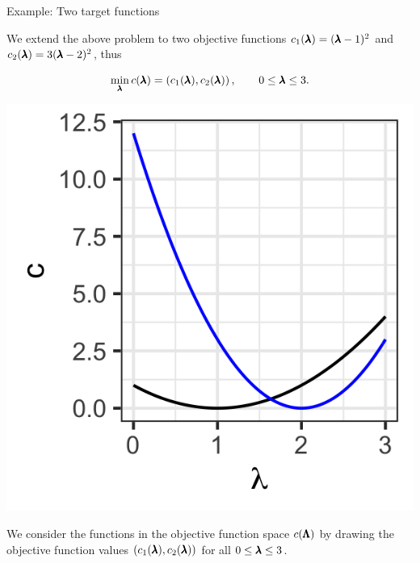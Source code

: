 \begin{frame}[allowframebreaks]{Example: Two target functions}

We extend the above problem to two objective functions $c_1(\pmb{\lambda}) = (\pmb{\lambda} - 1)^2$ and $c_2(\pmb{\lambda}) = 3(\pmb{\lambda} - 2)^2$, thus

$$
    \min_{\pmb{\lambda}} c(\pmb{\lambda}) = \left(c_1(\pmb{\lambda}), c_2(\pmb{\lambda})\right), \qquad 0 \le \pmb{\lambda} \le 3.
$$

    \begin{center}
    \includegraphics[scale=0.2]{images/graph2}
    \end{center}

\framebreak

We consider the functions in the objective function space $c(\pmb{\Lambda})$ by drawing the objective function values $\left(c_1(\pmb{\lambda}), c_2(\pmb{\lambda})\right)$ for all $0 \le \pmb{\lambda} \le 3$.

\vspace*{0.1cm}



\end{frame}
